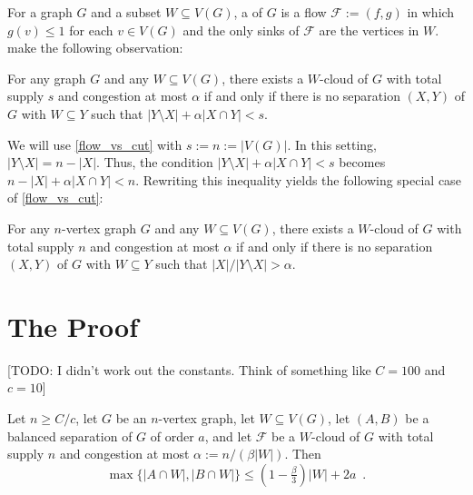 \documentclass{patmorin}
\begin{document}
For a graph $G$ and a subset $W\subseteq V(G)$, a  of $G$ is a flow $\mathcal{F}:=(f,g)$ in which $g(v)\le 1$ for each $v\in V(G)$ and the only sinks of $\mathcal{F}$ are the vertices in $W$.  \citet{dvorak.norin:treewidth} make the following observation:

\begin{obs}\label{flow_vs_cut}
  For any graph $G$ and any $W\subseteq V(G)$, there exists a $W$-cloud of $G$ with total supply $s$ and congestion at most $\alpha$ if and only if there is no separation $(X,Y)$ of $G$ with $W\subseteq Y$ such that $|Y\setminus X| + \alpha|X\cap Y| < s$.
\end{obs}

We will use \cref{flow_vs_cut} with $s:=n:=|V(G)|$.  In this setting,
$|Y\setminus X|=n-|X|$. Thus, the condition $|Y\setminus X|+\alpha|X\cap Y|<s$ becomes $n-|X|+\alpha|X\cap Y|< n$.  Rewriting this inequality yields the following special case of \cref{flow_vs_cut}:

\begin{obs}\label{flow_vs_cut_n}
  For any $n$-vertex graph $G$ and any $W\subseteq V(G)$, there exists a $W$-cloud of $G$ with total supply $n$ and congestion at most $\alpha$ if and only if there is no separation $(X,Y)$ of $G$ with $W\subseteq Y$ such that $|X|/|Y\setminus X| > \alpha$.
\end{obs}

\section{The Proof}

[TODO: I didn't work out the constants. Think of something like ${C}=100$ and ${c}=10$]

\begin{lem}\label{balanced_on_w}
  Let
  $n\ge {C}/{c}$, let $G$ be an $n$-vertex graph, let $W\subseteq V(G)$, let $(A,B)$ be a balanced separation of $G$ of order $a$, and let $\mathcal{F}$ be a $W$-cloud of $G$ with total supply $n$ and congestion at most $\alpha:=n/(\beta|W|)$.  Then
  \[
  \max\{|A\cap W|,|B\cap W|\}\le \left(1-\tfrac{\beta}{3}\right)|W|+2a \enspace .
  \]
\end{lem}
\end{document}
